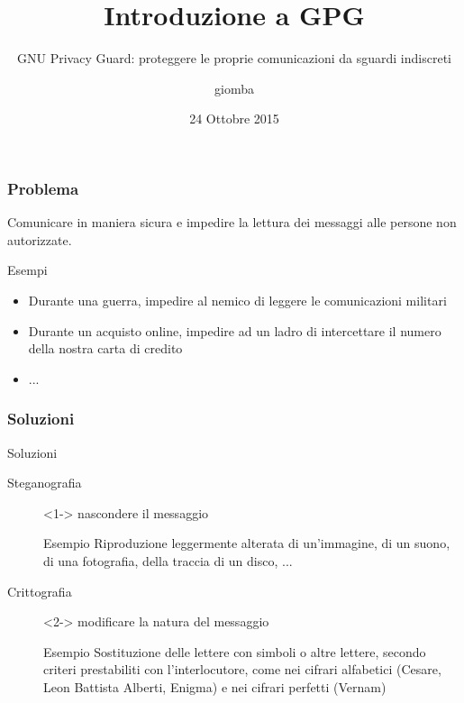 \documentclass{beamer}
\title{Introduzione a GPG}
\subtitle{GNU Privacy Guard: proteggere le proprie comunicazioni da sguardi indiscreti}
\author{giomba}
\date{24 Ottobre 2015}
\institute{GOLEM Empoli}
\begin{document}
\begin{frame}
  \maketitle
  \tableofcontents
\end{frame}

\begin{frame}
  \frametitle{Problema}
  Comunicare in maniera sicura e impedire la lettura dei messaggi
  alle persone non autorizzate.

  \pause
  \begin{exampleblock}{Esempi}
    \begin{itemize}
      \item Durante una guerra, impedire al nemico di leggere le comunicazioni militari
      \item Durante un acquisto online, impedire ad un ladro di intercettare il numero della nostra carta di credito
      \item ...
    \end{itemize}
  \end{exampleblock}
\end{frame}

\begin{frame}
  \frametitle{Soluzioni}

  \begin{block}{Soluzioni}
    \begin{description}
      \item[Steganografia]<1-> nascondere il messaggio
        \begin{minipage}{.9\linewidth}
          \begin{exampleblock}{Esempio}
            Riproduzione leggermente alterata di un'immagine, di un suono,
            di una fotografia, della traccia di un disco, ...
          \end{exampleblock}
        \end{minipage}
      \item[Crittografia]<2-> modificare la natura del messaggio
        \begin{minipage}{.9\linewidth}
          \begin{exampleblock}{Esempio}
            Sostituzione delle lettere con simboli o altre lettere, secondo
            criteri prestabiliti con l'interlocutore,
            come nei cifrari alfabetici (Cesare, Leon Battista Alberti, Enigma)
            e nei cifrari perfetti (Vernam)
          \end{exampleblock}
        \end{minipage}
    \end{description}
  \end{block}
\end{frame}
\end{document}
